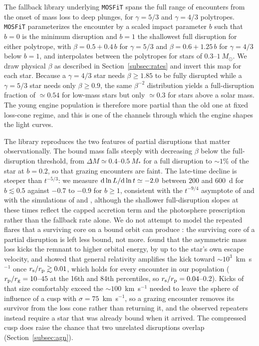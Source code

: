 \documentclass[twocolumn,pdftex]{aastex701}
\newcommand{\msun}{M_{\odot}\xspace}
\newcommand{\mosfit}{{\tt MOSFiT}\xspace}
\begin{document}
The fallback library underlying \mosfit spans the full range of encounters from the onset of mass loss to deep plunges, for $\gamma = 5/3$ and $\gamma = 4/3$ polytropes. \mosfit parameterizes the encounter by a scaled impact parameter $b$ such that $b = 0$ is the minimum disruption and $b = 1$ the shallowest full disruption for either polytrope, with $\beta = 0.5 + 0.4\,b$ for $\gamma = 5/3$ and $\beta = 0.6 + 1.25\,b$ for $\gamma = 4/3$ below $b = 1$, and interpolates between the polytropes for stars of $0.3$--$1~\msun$. We draw physical $\beta$ as described in Section~\ref{subsec:rates} and invert this map for each star. Because a $\gamma = 4/3$ star needs $\beta \geq 1.85$ to be fully disrupted while a $\gamma = 5/3$ star needs only $\beta \geq 0.9$, the same $\beta^{-2}$ distribution yields a full-disruption fraction of $\simeq 0.54$ for low-mass stars but only $\simeq 0.3$ for stars above a solar mass. The young engine population is therefore more partial than the old one at fixed loss-cone regime, and this is one of the channels through which the engine shapes the light curves.

The library reproduces the two features of partial disruptions that matter observationally. The bound mass falls steeply with decreasing $\beta$ below the full-disruption threshold, from $\Delta M \simeq 0.4$--$0.5~M_{\ast}$ for a full disruption to $\sim 1\%$ of the star at $b = 0.2$, so that grazing encounters are faint. The late-time decline is steeper than $t^{-5/3}$: we measure ${\rm d}\ln L/{\rm d}\ln t \simeq -2.0$ between $200$ and $600$~d for $b \lesssim 0.5$ against $-0.7$ to $-0.9$ for $b \geq 1$, consistent with the $t^{-9/4}$ asymptote of \citet{Coughlin:2019a} and with the simulations of \citet{Miles:2020a} and \citet{Nixon:2021a}, although the shallower full-disruption slopes at these times reflect the capped accretion term and the photosphere prescription rather than the fallback rate alone. We do not attempt to model the repeated flares that a surviving core on a bound orbit can produce \citep{Payne:2021a,Wevers:2023a,Lin:2024a,Somalwar:2025a,Hinkle:2024a,Liu:2025a}: the surviving core of a partial disruption is left less bound, not more. \citet{Manukian:2013a} found that the asymmetric mass loss kicks the remnant to higher orbital energy, by up to the star's own escape velocity, and \citet{Gafton:2015a} showed that general relativity amplifies the kick toward $\sim 10^{3}$~km~s$^{-1}$ once $r_{\rm s}/r_{\rm p} \gtrsim 0.01$, which holds for every encounter in our population ($r_{\rm p}/r_{\rm g} = 10$--$45$ at the 16th and 84th percentiles, so $r_{\rm s}/r_{\rm p} = 0.04$--$0.2$). Kicks of that size comfortably exceed the $\sim 100$~km~s$^{-1}$ needed to leave the sphere of influence of a cusp with $\sigma = 75$~km~s$^{-1}$, so a grazing encounter removes its survivor from the loss cone rather than returning it, and the observed repeaters instead require a star that was already bound when it arrived. The compressed cusp does raise the chance that two unrelated disruptions overlap (Section~\ref{subsec:agn}).
\end{document}
